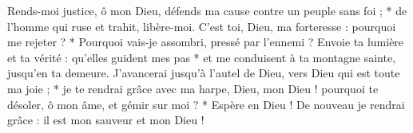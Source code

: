 Rends-moi justice, ô mon Dieu, défends ma cause contre un peuple sans foi ; * de l'homme qui ruse et trahit, libère-moi.
\versseparator
C'est toi, Dieu, ma forteresse : pourquoi me rejeter ? * Pourquoi vais-je assombri, pressé par l'ennemi ?
\versseparator
Envoie ta lumière et ta vérité : qu'elles guident mes pas * et me conduisent à ta montagne sainte, jusqu'en ta demeure.
\versseparator
J'avancerai jusqu'à l'autel de Dieu, vers Dieu qui est toute ma joie ; * je te rendrai grâce avec ma harpe, Dieu, mon Dieu !
\versseparator
pourquoi te désoler, ô mon âme, et gémir sur moi ?
\versseparator
* Espère en Dieu ! De nouveau je rendrai grâce : il est mon sauveur et mon Dieu !
